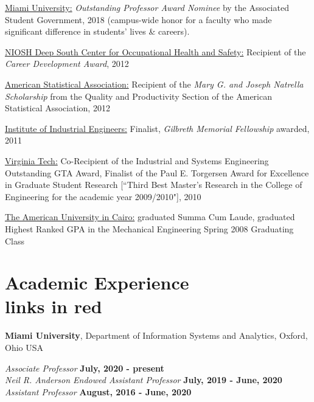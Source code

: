 \documentclass[margin,line]{res}
\begin{document}
\begin{resume}
\vspace*{-2.5mm}
\underline{Miami University:} \textit{Outstanding Professor Award Nominee} by the Associated Student Government, 2018 (campus-wide honor for a faculty who made significant difference in students' lives \& careers). 

\vspace*{-2.5mm}
\underline{NIOSH Deep South Center for Occupational Health and Safety:} Recipient of the \textit{Career Development Award}, 2012

\vspace*{-2.5mm}
\underline{American Statistical Association:} Recipient of the \textit{Mary G. and Joseph Natrella Scholarship} from the Quality and Productivity Section of the American Statistical Association, 2012 

\vspace*{-2.5mm}
\underline{Institute of Industrial Engineers:} Finalist, \textit{Gilbreth Memorial Fellowship} awarded, 2011

\vspace*{-2.5mm} 
\underline{Virginia Tech:} Co-Recipient of the Industrial and Systems Engineering Outstanding GTA Award, Finalist of the Paul E. Torgersen Award for Excellence in Graduate Student Research [``Third Best Master's Research in the College of Engineering for the academic year 2009/2010"], 2010

\vspace*{-2.5mm} 
\underline{The American University in Cairo:} graduated Summa Cum Laude, graduated Highest Ranked GPA in the Mechanical Engineering Spring 2008 Graduating Class
 
 
\section{\sc Academic Experience \\ \lbrack links in \textcolor{miamired}{red}\rbrack}
{\bf Miami University}, Department of Information Systems and Analytics, Oxford, Ohio USA

\vspace{-3.5mm}
{\em Associate Professor} \hfill {\bf July, 2020 - present}\\
{\em Neil R. Anderson Endowed Assistant Professor} \hfill {\bf July, 2019 - June, 2020}\\
{\em Assistant Professor} \hfill {\bf August, 2016 - June, 2020}\\


\end{resume}
\end{document}
